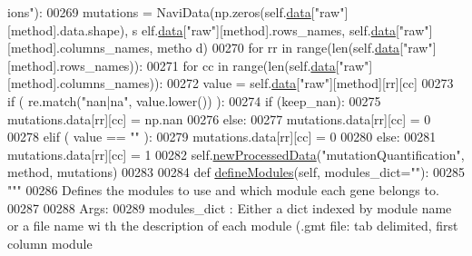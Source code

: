 \begin{DoxyCode}
{      ions"}):
00269             mutations = NaviData(np.zeros(self.\hyperlink{classnavicom_1_1navicom_1_1NaviCom_aa1abff245573ed8406c6bddb4596f093}{data}[\textcolor{stringliteral}{"raw"}][method].data.shape), s
      elf.\hyperlink{classnavicom_1_1navicom_1_1NaviCom_aa1abff245573ed8406c6bddb4596f093}{data}[\textcolor{stringliteral}{"raw"}][method].rows\_names, self.\hyperlink{classnavicom_1_1navicom_1_1NaviCom_aa1abff245573ed8406c6bddb4596f093}{data}[\textcolor{stringliteral}{"raw"}][method].columns\_names, metho
      d)
00270             \textcolor{keywordflow}{for} rr \textcolor{keywordflow}{in} range(len(self.\hyperlink{classnavicom_1_1navicom_1_1NaviCom_aa1abff245573ed8406c6bddb4596f093}{data}[\textcolor{stringliteral}{"raw"}][method].rows\_names)):
00271                 \textcolor{keywordflow}{for} cc \textcolor{keywordflow}{in} range(len(self.\hyperlink{classnavicom_1_1navicom_1_1NaviCom_aa1abff245573ed8406c6bddb4596f093}{data}[\textcolor{stringliteral}{"raw"}][method].columns\_names)):
00272                     value = self.\hyperlink{classnavicom_1_1navicom_1_1NaviCom_aa1abff245573ed8406c6bddb4596f093}{data}[\textcolor{stringliteral}{"raw"}][method][rr][cc]
00273                     \textcolor{keywordflow}{if} ( re.match(\textcolor{stringliteral}{"nan|na"}, value.lower()) ):
00274                         \textcolor{keywordflow}{if} (keep\_nan):
00275                             mutations.data[rr][cc] = np.nan
00276                         \textcolor{keywordflow}{else}:
00277                             mutations.data[rr][cc] = 0
00278                     \textcolor{keywordflow}{elif} ( value == \textcolor{stringliteral}{""} ):
00279                         mutations.data[rr][cc] = 0
00280                     \textcolor{keywordflow}{else}:
00281                         mutations.data[rr][cc] = 1
00282             self.\hyperlink{classnavicom_1_1navicom_1_1NaviCom_a42c3198667c80bbf3d61a3d57b39a883}{newProcessedData}(\textcolor{stringliteral}{"mutationQuantification"}, method, mutations)
00283 
00284     \textcolor{keyword}{def }\hyperlink{classnavicom_1_1navicom_1_1NaviCom_a6411b52971f15bd11270942cb98eaa1a}{defineModules}(self, modules\_dict=""):
00285         \textcolor{stringliteral}{"""}
00286 \textcolor{stringliteral}{        Defines the modules to use and which module each gene belongs to.}
00287 \textcolor{stringliteral}{}
00288 \textcolor{stringliteral}{        Args:}
00289 \textcolor{stringliteral}{            modules\_dict : Either a dict indexed by module name or a file name wi
      th the description of each module (.gmt file: tab delimited, first column module 
}
\end{DoxyCode}
